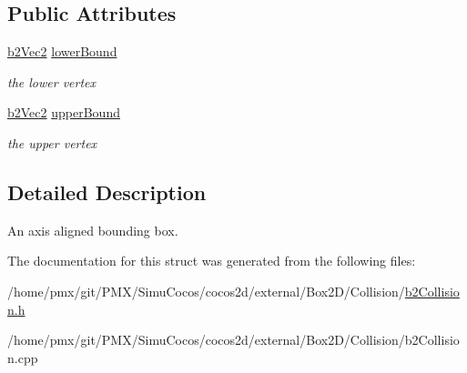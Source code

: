 \subsection*{Public Attributes}
\begin{DoxyCompactItemize}
\item 
\mbox{\label{structb2AABB_ab94b68fbad8348b22b0522469b11bdb5}} 
\hyperlink{structb2Vec2}{b2\+Vec2} \hyperlink{structb2AABB_ab94b68fbad8348b22b0522469b11bdb5}{lower\+Bound}
\begin{DoxyCompactList}\small\item\em the lower vertex \end{DoxyCompactList}\item 
\mbox{\label{structb2AABB_ad4a8ec483ba13a2c02918b01d058a18f}} 
\hyperlink{structb2Vec2}{b2\+Vec2} \hyperlink{structb2AABB_ad4a8ec483ba13a2c02918b01d058a18f}{upper\+Bound}
\begin{DoxyCompactList}\small\item\em the upper vertex \end{DoxyCompactList}\end{DoxyCompactItemize}


\subsection{Detailed Description}
An axis aligned bounding box. 

The documentation for this struct was generated from the following files\+:\begin{DoxyCompactItemize}
\item 
/home/pmx/git/\+P\+M\+X/\+Simu\+Cocos/cocos2d/external/\+Box2\+D/\+Collision/\hyperlink{cocos2d_2external_2Box2D_2Collision_2b2Collision_8h}{b2\+Collision.\+h}\item 
/home/pmx/git/\+P\+M\+X/\+Simu\+Cocos/cocos2d/external/\+Box2\+D/\+Collision/b2\+Collision.\+cpp\end{DoxyCompactItemize}
